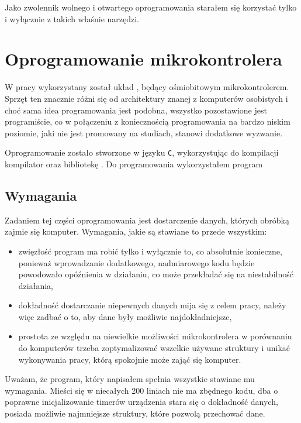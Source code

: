 \label{ch:implementation}

Jako zwolennik wolnego i otwartego oprogramowania starałem się korzystać tylko i wyłącznie z takich właśnie narzędzi.

\section{Oprogramowanie mikrokontrolera}
W pracy wykorzystany został układ , będący ośmiobitowym mikrokontrolerem. Sprzęt ten znacznie różni się od architektury znanej z komputerów osobistych  i choć sama idea programowania jest podobna, wszystko pozostawione jest programiście, co w połączeniu z koniecznością programowania na bardzo niskim poziomie, jaki nie jest promowany na studiach, stanowi dodatkowe wyzwanie.

Oprogramowanie zostało stworzone w języku \texttt{C}, wykorzystując do kompilacji kompilator  oraz bibliotekę . Do programowania wykorzystałem program 

\subsection{Wymagania}
Zadaniem tej części oprogramowania jest dostarczenie danych, których obróbką zajmie się komputer. Wymagania, jakie są stawiane to przede wszystkim:
\begin{itemize}
 \item zwięzłość \ppauza program ma robić tylko i wyłącznie to, co absolutnie konieczne, ponieważ wprowadzanie dodatkowego, nadmiarowego kodu będzie powodowało opóźnienia w działaniu, co może przekładać się na
    niestabilność działania,
 \item dokładność \ppauza dostarczanie niepewnych danych mija się z celem pracy, należy więc zadbać o to, aby dane były możliwie najdokładniejsze,
 \item prostota \ppauza ze względu na niewielkie możliwości mikrokontrolera \ppauza w porównaniu do komputerów \ppauza trzeba zoptymalizować wszelkie używane struktury i unikać wykonywania pracy, którą spokojnie może zająć się komputer.
\end{itemize}

Uważam, że program, który napisałem spełnia wszystkie stawiane mu wymagania. Mieści się w niecałych 200 liniach \ppauza nie ma zbędnego kodu, dba o poprawne inicjalizowanie timerów urządzenia \ppauza stara się o dokładność danych, posiada możliwie najmniejsze struktury, które pozwolą przechować dane.

